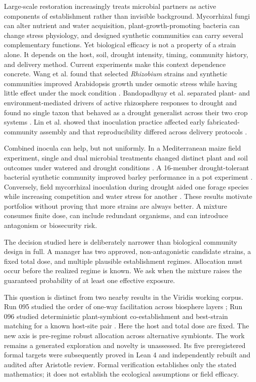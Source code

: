\documentclass[10pt,twocolumn]{article}
\begin{document}
Large-scale restoration increasingly treats microbial partners as active
components of establishment rather than invisible background. Mycorrhizal
fungi can alter nutrient and water acquisition, plant-growth-promoting
bacteria can change stress physiology, and designed synthetic communities can
carry several complementary functions. Yet biological efficacy is not a
property of a strain alone. It depends on the host, soil, drought intensity,
timing, community history, and delivery method. Current experiments make this
context dependence concrete. Wang et al. found that selected
\emph{Rhizobium} strains and synthetic communities improved Arabidopsis growth
under osmotic stress while having little effect under the mock condition
\cite{wang2024}. Bandopadhyay et al. separated plant- and environment-mediated
drivers of active rhizosphere responses to drought and found no single taxon
that behaved as a drought generalist across their two crop systems
\cite{bandopadhyay2024}. Lin et al. showed that inoculation practice affected
early fabricated-community assembly and that reproducibility differed across
delivery protocols \cite{lin2024}.

Combined inocula can help, but not uniformly. In a Mediterranean maize field
experiment, single and dual microbial treatments changed distinct plant and
soil outcomes under watered and drought conditions \cite{ouhaddou2024}. A
16-member drought-tolerant bacterial synthetic community improved barley
performance in a pot experiment \cite{rigerte2025}. Conversely, field
mycorrhizal inoculation during drought aided one forage species while
increasing competition and water stress for another \cite{amf2023}. These
results motivate portfolios without proving that more strains are always
better. A mixture consumes finite dose, can include redundant organisms, and
can introduce antagonism or biosecurity risk.

The decision studied here is deliberately narrower than biological community
design in full. A manager has two approved, non-antagonistic candidate strains,
a fixed total dose, and multiple plausible establishment regimes. Allocation
must occur before the realized regime is known. We ask when the mixture raises
the guaranteed probability of at least one effective exposure.

This question is distinct from two nearby results in the Viridis working
corpus. Run 095 studied the order of one-way facilitation across biosphere
layers \cite{run095}; Run 096 studied deterministic plant-symbiont
co-establishment and best-strain matching for a known host-site pair
\cite{run096}. Here the host and total dose are fixed. The new axis is
pre-regime robust allocation across alternative symbionts. The work remains a
generated exploration and novelty is unassessed. Its five preregistered formal
targets were subsequently proved in Lean 4 and independently rebuilt and
audited after Aristotle review. Formal verification establishes only the
stated mathematics; it does not establish the ecological assumptions or field
efficacy.
\end{document}
